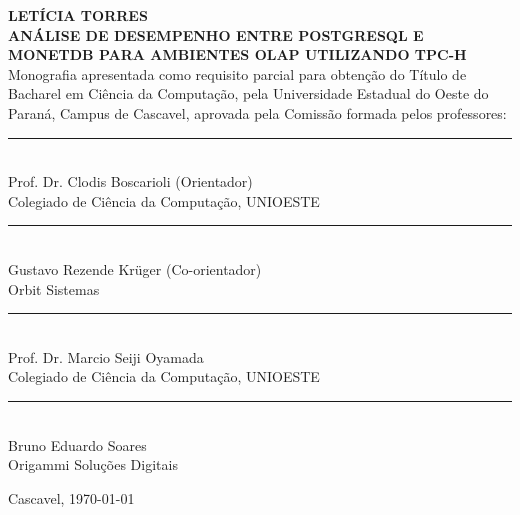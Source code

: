 

\begin{center}
\fontsize{12}{12}
\textbf{LETÍCIA TORRES}\\
\vspace{3cm}
\fontsize{14}{14}
\textbf{\MakeUppercase{Análise de Desempenho entre PostgreSQL e MonetDB para Ambientes OLAP Utilizando TPC-H}}\\
\vspace{3cm}
\fontsize{10}{10}
Monografia apresentada como requisito parcial para obtenção do Título de Bacharel em Ciência da Computação, pela Universidade Estadual do Oeste do Paraná, Campus de Cascavel, aprovada pela Comissão formada pelos professores:\\
\vspace{1.5cm}
\begin{flushright}
\begin{minipage}[10cm] {8.5cm}
\begin{center}
\rule{6cm}{0.01mm}\\
Prof. Dr. Clodis Boscarioli (Orientador)\\
Colegiado de Ciência da Computação, UNIOESTE\\
\vspace{1cm}
\rule{6cm}{0.01mm}\\
Gustavo Rezende Krüger (Co-orientador)\\
Orbit Sistemas\\
\vspace{1cm}
\rule{6cm}{0.01mm}\\
Prof. Dr. Marcio Seiji Oyamada\\
Colegiado de Ciência da Computação, UNIOESTE\\
\vspace{1cm}
\rule{6cm}{0.01mm}\\
Bruno Eduardo Soares\\
Origammi Soluções Digitais\\
\end{center}
\end{minipage}
\end{flushright}
\vspace{2cm}
Cascavel, \today
\end{center} 
